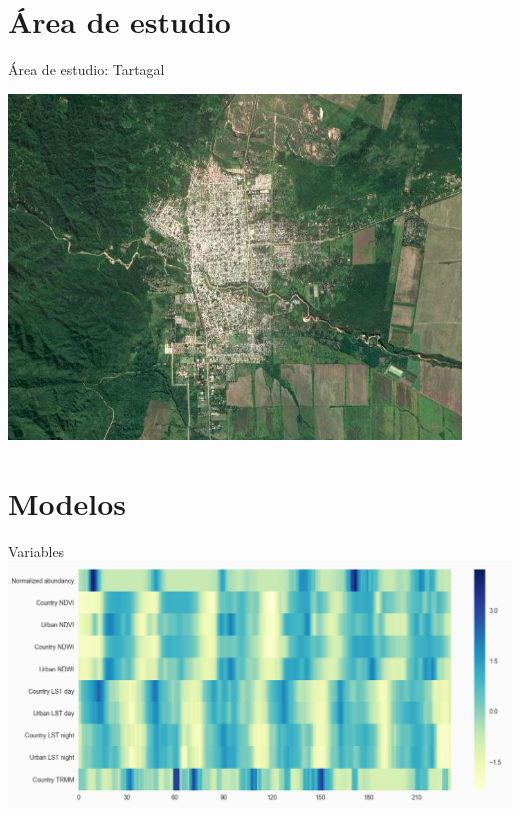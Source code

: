 \documentclass[10pt]{beamer}
\begin{document}
\section{Área de estudio}

\begin{frame}{Área de estudio: Tartagal}
\begin{center}
\includegraphics[width=0.9\textwidth]{tartagal.jpeg}
\end{center}

\end{frame}

\section{Modelos}

\begin{frame}{Variables}
  \includegraphics[width=1\textwidth]{all_variables.png}


\end{frame}
\end{document}
